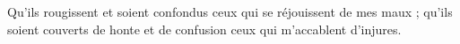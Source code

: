 Qu’ils rougissent et soient confondus ceux qui se réjouissent de mes maux ; qu’ils soient couverts de honte et de confusion ceux qui m’accablent d’injures.
